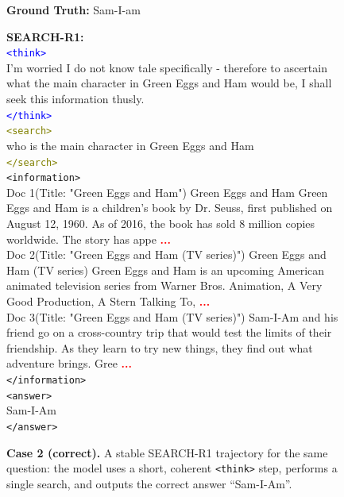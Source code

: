 \begin{figure}[t]
\centering
\begin{tcolorbox}[
  colback=white,
  colframe=black!60,
  title=\textbf{Question:} Who is the main character in green eggs and ham?
]
\textbf{Ground Truth:} Sam-I-am

\vspace{0.5em}
\textbf{SEARCH-R1:}\\
\textcolor{blue}{\texttt{<think>}}\\
I'm worried I do not know tale specifically - therefore to ascertain what the main character in Green Eggs and Ham would be, I shall seek this information thusly.\\
\textcolor{blue}{\texttt{</think>}}\\[0.7em]
\textcolor{olive}{\texttt{<search>}}\\
who is the main character in Green Eggs and Ham\\
\textcolor{olive}{\texttt{</search>}}\\[0.7em]
\textcolor{teal!60!black}{\texttt{<information>}}\\
Doc 1(Title: "Green Eggs and Ham") Green Eggs and Ham Green Eggs and Ham is a children's book by Dr. Seuss, first published on August 12, 1960. As of 2016, the book has sold 8 million copies worldwide. The story has appe \textcolor{red}{\textbf{...}} \\
Doc 2(Title: "Green Eggs and Ham (TV series)") Green Eggs and Ham (TV series) Green Eggs and Ham is an upcoming American animated television series from Warner Bros. Animation, A Very Good Production, A Stern Talking To, \textcolor{red}{\textbf{...}} \\
Doc 3(Title: "Green Eggs and Ham (TV series)") Sam-I-Am and his friend go on a cross-country trip that would test the limits of their friendship. As they learn to try new things, they find out what adventure brings. Gree \textcolor{red}{\textbf{...}}\\
\textcolor{teal!60!black}{\texttt{</information>}}\\[0.7em]
\textcolor{magenta!70!black}{\texttt{<answer>}}\\
Sam-I-Am\\
\textcolor{magenta!70!black}{\texttt{</answer>}}\\[0.7em]
\end{tcolorbox}
\caption{\textbf{Case 2 (correct).} A stable SEARCH-R1 trajectory for the same question: the model uses a short, coherent \texttt{<think>} step, performs a single search, and outputs the correct answer ``Sam-I-Am''.}
\label{fig:geeh-correct}
\end{figure}


